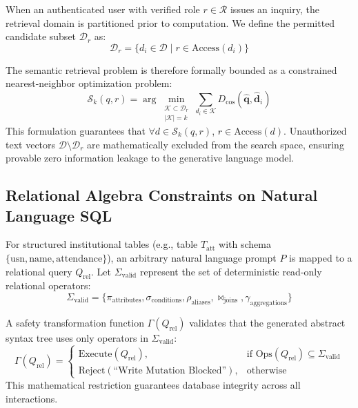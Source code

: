 \documentclass[conference]{IEEEtran}
\begin{document}
When an authenticated user with verified role $r \in \mathcal{R}$ issues an inquiry, the retrieval domain is partitioned prior to computation. We define the permitted candidate subset $\mathcal{D}_r$ as:
\begin{equation}
\mathcal{D}_r = \{ d_i \in \mathcal{D} \mid r \in \text{Access}(d_i) \}
\end{equation}

The semantic retrieval problem is therefore formally bounded as a constrained nearest-neighbor optimization problem:
\begin{equation}
\mathcal{S}_k(q, r) = \arg\min_{\substack{\mathcal{K} \subset \mathcal{D}_r \\ |\mathcal{K}| = k}} \sum_{d_i \in \mathcal{K}} D_{\text{cos}}(\hat{\mathbf{q}}, \hat{\mathbf{d}}_i)
\end{equation}
This formulation guarantees that $\forall d \in \mathcal{S}_k(q, r)$, $r \in \text{Access}(d)$. Unauthorized text vectors $\mathcal{D} \setminus \mathcal{D}_r$ are mathematically excluded from the search space, ensuring provable zero information leakage to the generative language model.

\subsection{Relational Algebra Constraints on Natural Language SQL}
For structured institutional tables (e.g., table $T_{\text{att}}$ with schema $\{ \text{usn}, \text{name}, \text{attendance} \}$), an arbitrary natural language prompt $P$ is mapped to a relational query $Q_{\text{rel}}$. Let $\Sigma_{\text{valid}}$ represent the set of deterministic read-only relational operators:
\begin{equation}
\Sigma_{\text{valid}} = \{ \pi_{\text{attributes}}, \sigma_{\text{conditions}}, \rho_{\text{aliases}}, \bowtie_{\text{joins}}, \gamma_{\text{aggregations}} \}
\end{equation}

A safety transformation function $\Gamma(Q_{\text{rel}})$ validates that the generated abstract syntax tree uses only operators in $\Sigma_{\text{valid}}$:
\begin{equation}
\Gamma(Q_{\text{rel}}) = 
\begin{cases} 
\text{Execute}(Q_{\text{rel}}), & \text{if } \text{Ops}(Q_{\text{rel}}) \subseteq \Sigma_{\text{valid}} \\ 
\text{Reject}(\text{``Write Mutation Blocked''}), & \text{otherwise} 
\end{cases}
\end{equation}
This mathematical restriction guarantees database integrity across all interactions.
\end{document}

